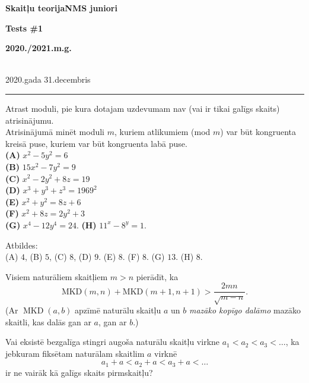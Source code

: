 \documentclass[a4paper,12pt]{article}
\begin{document}
\begin{center}
\parbox{3.5cm}{\flushleft\bf Skaitļu teorija\linebreak NMS juniori} \hfill {\bf\LARGE Tests \#1} \hfill \parbox{3.5cm}{\flushright\bf 2020./2021.m.g.} \\[2pt]
\rm\small 2020.gada 31.decembris
\end{center}

\hrule

\vspace{20pt}


\vspace{20pt}
\begin{problem}
Atrast moduli, pie kura dotajam uzdevumam nav 
(vai ir tikai galīgs skaits) atrisinājumu.\\
Atrisinājumā minēt moduli $m$, kuriem atlikumiem (mod $m$) 
var būt kongruenta kreisā puse, kuriem var būt kongruenta labā puse.\\
{\bf (A)} $x^2 - 5y^2 = 6$\\
{\bf (B)} $15x^2 - 7y^2 = 9$\\
{\bf (C)} $x^2 - 2y^2 + 8z = 19$\\
{\bf (D)} $x^3 + y^3 + z^3 = 1969^2$\\
{\bf (E)} $x^2 + y^2 = 8z + 6$\\
{\bf (F)} $x^2 + 8z = 2y^2 + 3$\\
{\bf (G)} $x^4 - 12y^4 = 24$. 
{\bf (H)} $11^x - 8^y = 1$. 

Atbildes:\\
(A) $4$, (B) $5$, (C) $8$, (D) $9$. (E) $8$. (F) $8$. (G) $13$. (H) $8$. 






\vspace{20pt}
\begin{problem} 
Visiem naturāliem skaitļiem $m > n$ pierādīt, ka
$$\mbox{MKD}(m,n) + \mbox{MKD}(m+1,n+1) > \frac{2mn}{\sqrt{m-n}}.$$
(Ar $\operatorname{MKD}(a,b)$ apzīmē naturālu skaitļu $a$ un $b$ {\em mazāko 
kopīgo dalāmo} \textendash{} mazāko skaitli, kas dalās gan ar $a$, gan ar $b$.)
\end{problem}

\vspace{20pt}
\begin{problem}
Vai eksistē bezgalīga
stingri augoša naturālu skaitļu virkne $a_1 < a_2 < a_3 <\ldots$,
ka jebkuram fiksētam naturālam skaitlim $a$ virknē 
$$a_1+a < a_2+a < a_3 + a < \ldots$$
ir ne vairāk kā galīgs skaits pirmskaitļu?
\end{problem}


\end{problem}
\end{document}
